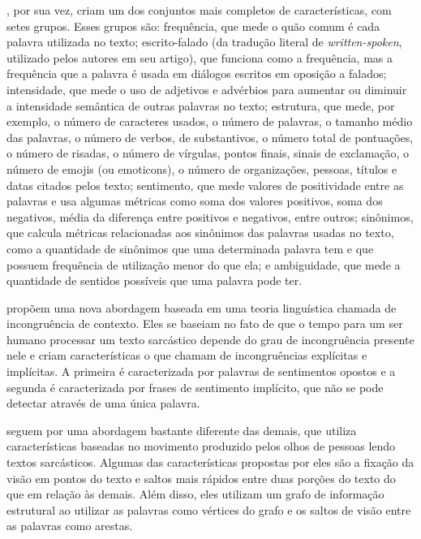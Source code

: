\cite{barbieri:2014:modelling-sarcasm}, por sua vez, criam um dos conjuntos mais
completos de características, com setes grupos. Esses grupos são: frequência,
que mede o quão comum é cada palavra utilizada no texto; escrito-falado (da
tradução literal de \textit{written-spoken}, utilizado pelos autores em seu
artigo), que funciona como a frequência, mas a frequência que a palavra é usada
em diálogos escritos em oposição a falados; intensidade, que mede o uso de
adjetivos e advérbios para aumentar ou diminuir a intensidade semântica de
outras palavras no texto; estrutura, que mede, por exemplo, o número de
caracteres usados, o número de palavras, o tamanho médio das palavras, o número
de verbos, de substantivos, o número total de pontuações, o número de risadas, o
número de vírgulas, pontos finais, sinais de exclamação, o número de emojis (ou
emoticons), o número de organizações, pessoas, títulos e datas citados pelos
texto; sentimento, que mede valores de positividade entre as palavras e usa
algumas métricas como soma dos valores positivos, soma dos negativos, média da
diferença entre positivos e negativos, entre outros; sinônimos, que calcula
métricas relacionadas aos sinônimos das palavras usadas no texto, como a
quantidade de sinônimos que uma determinada palavra tem e que possuem frequência
de utilização menor do que ela; e ambiguidade, que mede a quantidade de sentidos
possíveis que uma palavra pode ter.

\cite{joshi:2015:context-incongruity} propõem uma nova abordagem baseada em uma
teoria linguística chamada de incongruência de contexto. Eles se baseiam no fato
de que o tempo para um ser humano processar um texto sarcástico depende do grau
de incongruência presente nele e criam características o que chamam de
incongruências explícitas e implícitas. A primeira é caracterizada por palavras
de sentimentos opostos e a segunda é caracterizada por frases de sentimento
implícito, que não se pode detectar através de uma única palavra.

\cite{mishra:2016:harnessing-cognitive} seguem por uma abordagem bastante
diferente das demais, que utiliza características baseadas no movimento
produzido pelos olhos de pessoas lendo textos sarcásticos. Algumas das
características propostas por eles são a fixação da visão em pontos do texto e
saltos mais rápidos entre duas porções do texto do que em relação às demais.
Além disso, eles utilizam um grafo de informação estrutural ao utilizar as
palavras como vértices do grafo e os saltos de visão entre as palavras como
arestas.


